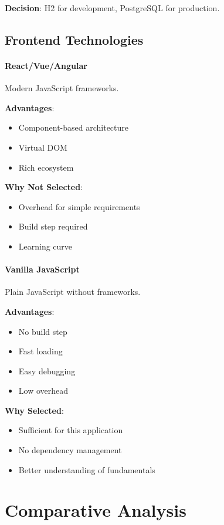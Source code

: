 \documentclass[12pt,a4paper,twoside]{book}
\newcommand{\subsubsubsection}[1]{\paragraph{#1}}
\begin{document}
\textbf{Decision}: H2 for development, PostgreSQL for production.

\subsection{Frontend Technologies}

\subsubsubsection{React/Vue/Angular}
Modern JavaScript frameworks.

\textbf{Advantages}:
\begin{itemize}
    \item Component-based architecture
    \item Virtual DOM
    \item Rich ecosystem
\end{itemize}

\textbf{Why Not Selected}:
\begin{itemize}
    \item Overhead for simple requirements
    \item Build step required
    \item Learning curve
\end{itemize}

\subsubsubsection{Vanilla JavaScript}
Plain JavaScript without frameworks.

\textbf{Advantages}:
\begin{itemize}
    \item No build step
    \item Fast loading
    \item Easy debugging
    \item Low overhead
\end{itemize}

\textbf{Why Selected}:
\begin{itemize}
    \item Sufficient for this application
    \item No dependency management
    \item Better understanding of fundamentals
\end{itemize}

\section{Comparative Analysis}
\end{document}
